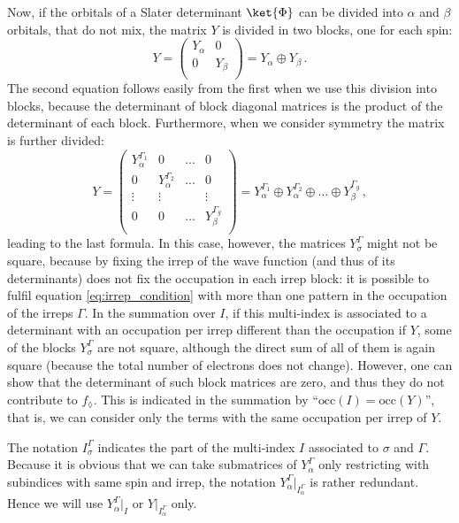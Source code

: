 \documentclass[a4paper,11pt]{article}
\newcommand{\irp}{\ensuremath{\Gamma}}
\begin{document}
Now, if the orbitals of a Slater determinant $\ket{\Phi}$ can be divided into $\alpha$ and $\beta$ orbitals, that do not mix, the matrix $Y$ is divided in two blocks, one for each spin:
\begin{equation}
  Y =
  \begin{pmatrix}
    Y_\alpha & 0\\
    0 & Y_\beta\\
  \end{pmatrix}
  = Y_\alpha \oplus Y_\beta\,.
\end{equation}
The second equation follows easily from the first when we use this division into blocks, because the determinant of block diagonal matrices is the product of the determinant of each block.
Furthermore, when we consider symmetry the matrix is further divided:
\begin{equation}\label{eq:Y_spin_irrep_blocks}
  Y =
  \begin{pmatrix}
    Y_\alpha^{\irp_1} & 0 & ... & 0\\
    0 & Y_\alpha^{\irp_2} & ... & 0 \\
    \vdots & \vdots & & \vdots\\
    0 & 0 &\dots & Y_\beta^{\irp_g}\\
  \end{pmatrix}
  = Y_\alpha^{\irp_1} \oplus Y_\alpha^{\irp_2} \oplus \dots \oplus Y_\beta^{\irp_g}\,,
\end{equation}
leading to the last formula.
In this case, however, the matrices $Y_\sigma^\irp$ might not be square, because by fixing the irrep of the wave function (and thus of its determinants) does not fix the occupation in each irrep block:
it is possible to fulfil equation \eqref{eq:irrep_condition} with more than one pattern in the occupation of the irreps $\irp$.
In the summation over $I$, if this multi-index is associated to a determinant with an occupation per irrep different than the occupation if $Y$, some of the blocks $Y_\sigma^\irp$ are not square, although the direct sum of all of them is again square (because the total number of electrons does not change).
However, one can show that the determinant of such block matrices are zero, and thus they do not contribute to $f_\lozenge$.
This is indicated in the summation by ``$\text{occ}(I) = \text{occ}(Y)$'', that is, we can consider only the terms with the same occupation per irrep of $Y$.

The notation $I_\sigma^\irp$ indicates the part of the multi-index $I$ associated to $\sigma$ and $\irp$.
Because it is obvious that we can take submatrices of $Y_\alpha^\irp$ only restricting with subindices with same spin and irrep, the notation $Y_\alpha^\irp\big|_{I_\alpha^\irp}$ is rather redundant.
Hence we will use $Y_\alpha^\irp\big|_{I}$ or $Y\big|_{I_\alpha^\irp}$ only.
\end{document}
